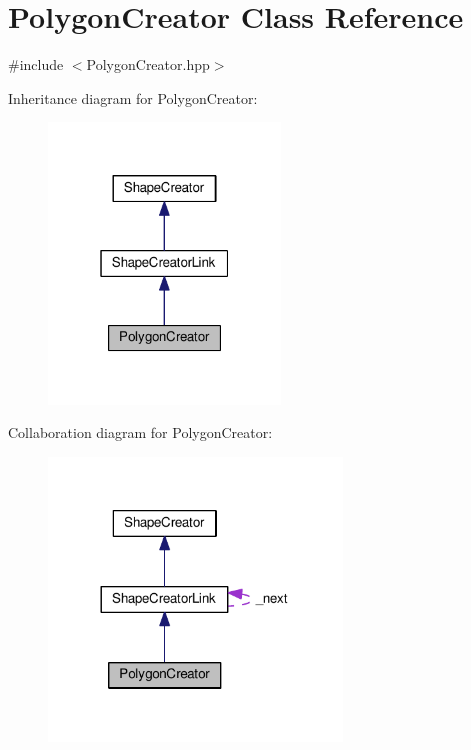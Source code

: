 \hypertarget{class_polygon_creator}{}\section{Polygon\+Creator Class Reference}
\label{class_polygon_creator}


{\ttfamily \#include $<$Polygon\+Creator.\+hpp$>$}



Inheritance diagram for Polygon\+Creator\+:\nopagebreak
\begin{figure}[H]
\begin{center}
\leavevmode
\includegraphics[width=175pt]{class_polygon_creator__inherit__graph}
\end{center}
\end{figure}


Collaboration diagram for Polygon\+Creator\+:\nopagebreak
\begin{figure}[H]
\begin{center}
\leavevmode
\includegraphics[width=221pt]{class_polygon_creator__coll__graph}
\end{center}
\end{figure}
